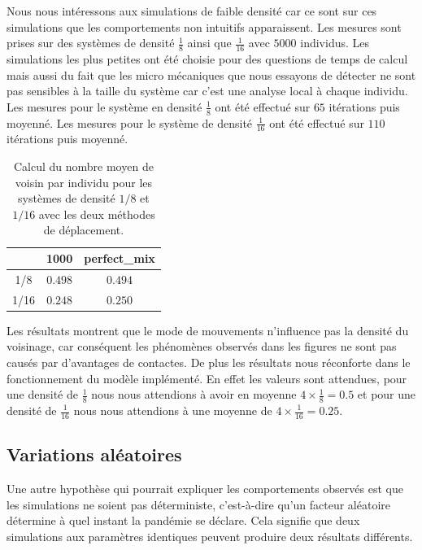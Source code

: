 Nous nous intéressons aux simulations de faible densité car ce sont sur ces simulations que les comportements non intuitifs apparaissent. Les mesures sont prises sur des systèmes de densité $\frac{1}{8}$ ainsi que $\frac{1}{16}$ avec $5000$ individus. Les simulations les plus petites ont été choisie pour des questions de temps de calcul mais aussi du fait que les micro mécaniques que nous essayons de détecter ne sont pas sensibles à la taille du système car c'est une analyse local à chaque individu.\\

Les mesures pour le système en densité $\frac{1}{8}$ ont été effectué sur $65$ itérations puis moyenné. Les mesures pour le système de densité $\frac{1}{16}$ ont été effectué sur $110$ itérations puis moyenné.

\begin{table}[H]
\centering
\captionsetup{justification=centering}
\caption[Voisinage moyen : SI]{Calcul du nombre moyen de voisin par individu pour les systèmes de densité $1/8$ et $1/16$ avec les deux méthodes de déplacement.\label{tab:grid}}
\begin{tabular}{@{\extracolsep{\fill} } c|| c| c|}
 & 1000 & perfect\_mix\\ 
\midrule
\midrule
1/8 & $0.498$ & $0.494$\\
\midrule
1/16 & $0.248$ & $0.250$\\
\bottomrule
\end{tabular}
\end{table}

Les résultats montrent que le mode de mouvements n'influence pas la densité du voisinage, car conséquent les phénomènes observés dans les figures ne sont pas causés par d'avantages de contactes. De plus les résultats nous réconforte dans le fonctionnement du modèle implémenté. En effet les valeurs sont attendues, pour une densité de $\frac{1}{8}$ nous nous attendions à avoir en moyenne $4\times \frac{1}{8} = 0.5$ et pour une densité de $\frac{1}{16}$ nous nous attendions à une moyenne de $4\times \frac{1}{16} = 0.25$.

\subsection{Variations aléatoires}

Une autre hypothèse qui pourrait expliquer les comportements observés est que les simulations ne soient pas déterministe, c'est-à-dire qu'un facteur aléatoire détermine à quel instant la pandémie se déclare. Cela signifie que deux simulations aux paramètres identiques peuvent produire deux résultats différents.\\

